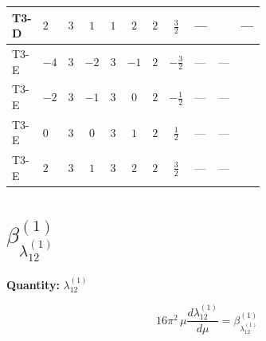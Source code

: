 \documentclass[8pt]{article}
\begin{document}
\begin{landscape}
\begin{longtable}{@{}llcccccc >{\raggedright\arraybackslash}p{0.21\linewidth} >{\raggedright\arraybackslash}p{0.21\linewidth} >{\raggedright\arraybackslash}p{0.21\linewidth}@{}}
\midrule
T3-D & $2$ & $3$ & $1$ & $1$ & $2$ & $2$ & $\frac{3}{2}$ & --- & \scriptsize\adjustbox{max width=\linewidth}{$\begin{gathered} {\lambda_{HS_2}^{(1)}} (4 T_{\nu}^{(2)}+6 \operatorname{Tr}\!\left({Y_d}\,\left({Y_d}\right)^{\dagger}\right)+2 \operatorname{Tr}\!\left({Y_e}\,\left({Y_e}\right)^{\dagger}\right)+6 \operatorname{Tr}\!\left({Y_u}\,\left({Y_u}\right)^{\dagger}\right))\end{gathered}$} & --- \\
\midrule
T3-E & $-4$ & $3$ & $-2$ & $3$ & $-1$ & $2$ & $-\frac{3}{2}$ & --- & --- & \scriptsize\adjustbox{max width=\linewidth}{$\begin{gathered} +{\lambda_{HS_1}^{(1)}} (6 {\lambda_{12}^{(1)}}+4 {\lambda_{12}^{(\times)}})\end{gathered}$} \\
\midrule
T3-E & $-2$ & $3$ & $-1$ & $3$ & $0$ & $2$ & $-\frac{1}{2}$ & --- & --- & \scriptsize\adjustbox{max width=\linewidth}{$\begin{gathered} +{\lambda_{HS_1}^{(1)}} (6 {\lambda_{12}^{(1)}}+4 {\lambda_{12}^{(\times)}})\end{gathered}$} \\
\midrule
T3-E & $0$ & $3$ & $0$ & $3$ & $1$ & $2$ & $\frac{1}{2}$ & --- & --- & \scriptsize\adjustbox{max width=\linewidth}{$\begin{gathered} +{\lambda_{HS_1}^{(1)}} (6 {\lambda_{12}^{(1)}}+4 {\lambda_{12}^{(\times)}})\end{gathered}$} \\
\midrule
T3-E & $2$ & $3$ & $1$ & $3$ & $2$ & $2$ & $\frac{3}{2}$ & --- & --- & \scriptsize\adjustbox{max width=\linewidth}{$\begin{gathered} +{\lambda_{HS_1}^{(1)}} (6 {\lambda_{12}^{(1)}}+4 {\lambda_{12}^{(\times)}})\end{gathered}$} \\
\midrule
\bottomrule
\end{longtable}
\clearpage
\section*{$\beta_{\lambda_{12}^{(1)}}^{(1)}$}
\noindent\textbf{Quantity: }$\lambda_{12}^{(1)}$\par\smallskip
\[16\pi^2\,\mu\frac{d \lambda_{12}^{(1)}}{d\mu}=\beta_{\lambda_{12}^{(1)}}^{(1)}\]

\end{landscape}
\end{document}
